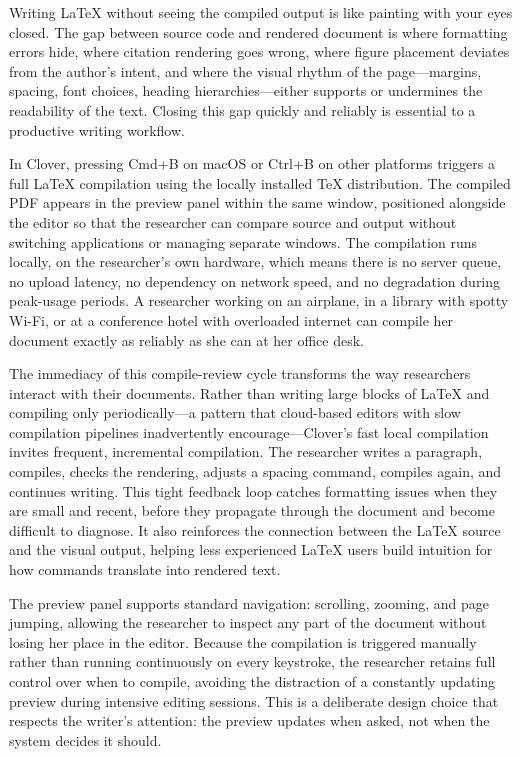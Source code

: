 \documentclass[a4paper,11pt]{article}
\begin{document}
Writing \LaTeX{} without seeing the compiled output is like painting with your eyes closed. The gap between source code and rendered document is where formatting errors hide, where citation rendering goes wrong, where figure placement deviates from the author's intent, and where the visual rhythm of the page---margins, spacing, font choices, heading hierarchies---either supports or undermines the readability of the text. Closing this gap quickly and reliably is essential to a productive writing workflow.

In Clover, pressing Cmd+B on macOS or Ctrl+B on other platforms triggers a full \LaTeX{} compilation using the locally installed TeX distribution. The compiled PDF appears in the preview panel within the same window, positioned alongside the editor so that the researcher can compare source and output without switching applications or managing separate windows. The compilation runs locally, on the researcher's own hardware, which means there is no server queue, no upload latency, no dependency on network speed, and no degradation during peak-usage periods. A researcher working on an airplane, in a library with spotty Wi-Fi, or at a conference hotel with overloaded internet can compile her document exactly as reliably as she can at her office desk.

The immediacy of this compile-review cycle transforms the way researchers interact with their documents. Rather than writing large blocks of \LaTeX{} and compiling only periodically---a pattern that cloud-based editors with slow compilation pipelines inadvertently encourage---Clover's fast local compilation invites frequent, incremental compilation. The researcher writes a paragraph, compiles, checks the rendering, adjusts a spacing command, compiles again, and continues writing. This tight feedback loop catches formatting issues when they are small and recent, before they propagate through the document and become difficult to diagnose. It also reinforces the connection between the \LaTeX{} source and the visual output, helping less experienced \LaTeX{} users build intuition for how commands translate into rendered text.

The preview panel supports standard navigation: scrolling, zooming, and page jumping, allowing the researcher to inspect any part of the document without losing her place in the editor. Because the compilation is triggered manually rather than running continuously on every keystroke, the researcher retains full control over when to compile, avoiding the distraction of a constantly updating preview during intensive editing sessions. This is a deliberate design choice that respects the writer's attention: the preview updates when asked, not when the system decides it should.
\end{document}
